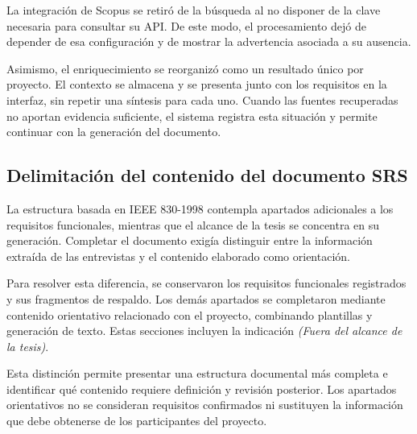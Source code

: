 La integración de Scopus se retiró de la búsqueda
al no disponer de la clave necesaria para consultar
su API. De este modo, el procesamiento dejó de depender
de esa configuración y de mostrar la advertencia
asociada a su ausencia.

Asimismo, el enriquecimiento se reorganizó como un
resultado único por proyecto. El contexto se almacena
y se presenta junto con los requisitos en la interfaz,
sin repetir una síntesis para cada uno. Cuando las
fuentes recuperadas no aportan evidencia suficiente,
el sistema registra esta situación y permite continuar
con la generación del documento.

\subsection{Delimitación del contenido del documento SRS}

La estructura basada en IEEE 830-1998 contempla
apartados adicionales a los requisitos funcionales,
mientras que el alcance de la tesis se concentra
en su generación. Completar el documento exigía
distinguir entre la información extraída de las
entrevistas y el contenido elaborado como orientación.

Para resolver esta diferencia, se conservaron los
requisitos funcionales registrados y sus fragmentos
de respaldo. Los demás apartados se completaron
mediante contenido orientativo relacionado con el
proyecto, combinando plantillas y generación de texto.
Estas secciones incluyen la indicación
\textit{(Fuera del alcance de la tesis)}.

Esta distinción permite presentar una estructura
documental más completa e identificar qué contenido
requiere definición y revisión posterior. Los apartados
orientativos no se consideran requisitos confirmados
ni sustituyen la información que debe obtenerse
de los participantes del proyecto.
